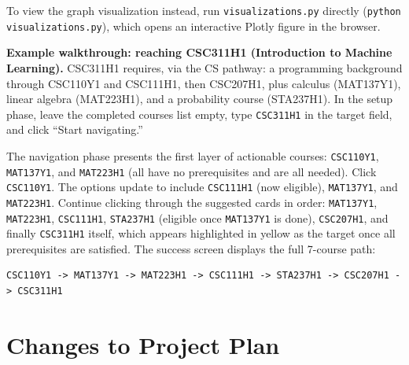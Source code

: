 \documentclass[11pt]{article}
\begin{document}
To view the graph visualization instead, run \verb|visualizations.py| directly
(\verb|python visualizations.py|), which opens an interactive Plotly figure in the browser.

\textbf{Example walkthrough: reaching CSC311H1 (Introduction to Machine Learning).}
CSC311H1 requires, via the CS pathway: a programming background through CSC110Y1 and
CSC111H1, then CSC207H1, plus calculus (MAT137Y1), linear algebra (MAT223H1), and a
probability course (STA237H1). In the setup phase, leave the completed courses list empty,
type \verb|CSC311H1| in the target field, and click ``Start navigating.''

The navigation phase presents the first layer of actionable courses:
\verb|CSC110Y1|, \verb|MAT137Y1|, and \verb|MAT223H1| (all have no prerequisites and are all
needed). Click \verb|CSC110Y1|. The options update to include \verb|CSC111H1| (now eligible),
\verb|MAT137Y1|, and \verb|MAT223H1|. Continue clicking through the suggested cards in order:
\verb|MAT137Y1|, \verb|MAT223H1|, \verb|CSC111H1|, \verb|STA237H1| (eligible once
\verb|MAT137Y1| is done), \verb|CSC207H1|, and finally \verb|CSC311H1| itself, which appears
highlighted in yellow as the target once all prerequisites are satisfied. The success screen
displays the full 7-course path:
\begin{verbatim}
CSC110Y1 -> MAT137Y1 -> MAT223H1 -> CSC111H1 -> STA237H1 -> CSC207H1 -> CSC311H1
\end{verbatim}

\section*{Changes to Project Plan}
\end{document}
